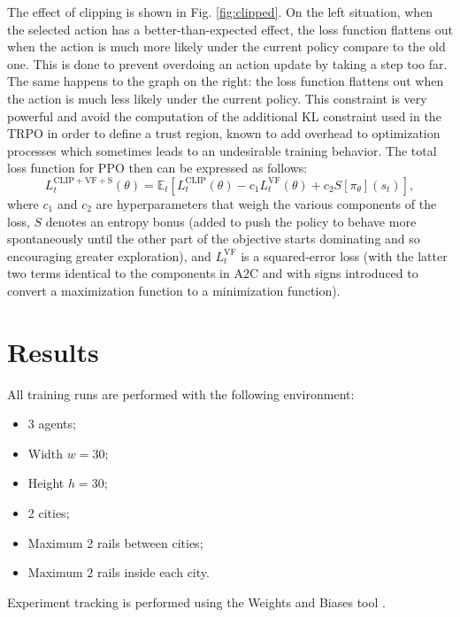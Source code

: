 \documentclass[a4paper, 12pt]{article}
\numberwithin{equation}{section}
\begin{document}
The effect of clipping is shown in Fig. \ref{fig:clipped}. On the left situation, when the selected action has a better-than-expected effect, the loss function flattens out when the action is much more likely under the current policy compare to the old one. This is done to prevent overdoing an action update by taking a step too far. The same happens to the graph on the right: the loss function flattens out when the action is much less likely under the current policy. This constraint is very powerful and avoid the computation of the additional KL constraint used in the TRPO in order to define a trust region, known to add overhead to optimization processes which sometimes leads to an undesirable training behavior. The total loss function for PPO then can be expressed as follows:
\begin{equation}
	L_t^{\mathrm{CLIP}+\mathrm{VF}+\mathrm{S}}\left(\theta\right)=\mathbb{E}_t\left[L_t^\mathrm{CLIP}\left(\theta\right)-c_1L_t^\mathrm{VF}\left(\theta\right)+c_2S\left[\pi_\theta\right]\left(s_t\right)\right],
\end{equation}
where $c_1$ and $c_2$ are hyperparameters that weigh the various components of the loss, $S$ denotes an entropy bonus (added to push the policy to behave more spontaneously until the other part of the objective starts dominating and so encouraging greater exploration), and $L_t^\mathrm{VF}$ is a squared-error loss (with the latter two terms identical to the components in A2C and with signs introduced to convert a maximization function to a minimization function).




\clearpage
\section{Results}

All training runs are performed with the following environment:
\begin{itemize}
	\item 3 agents;
	\item Width $w = 30$;
	\item Height $h = 30$;
	\item 2 cities;
	\item Maximum 2 rails between cities;
	\item Maximum 2 rails inside each city.
\end{itemize}

Experiment tracking is performed using the Weights and Biases tool \cite{wandb}.
\end{document}
